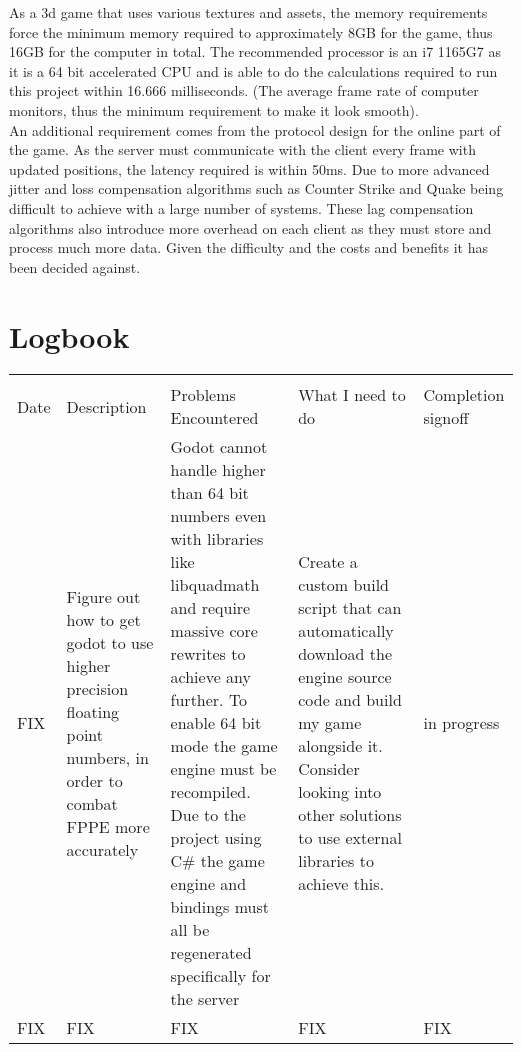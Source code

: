 \documentclass[12pt, DIV=calc]{scrartcl}
\begin{document}
\noindent As a 3d game that uses various textures and assets, the memory requirements force the minimum memory required to approximately 8GB for the game, thus 16GB for the computer in total. The recommended processor is an i7 1165G7 as it is a 64 bit accelerated CPU and is able to do the calculations required to run this project within 16.666 milliseconds. (The average frame rate of computer monitors, thus the minimum requirement to make it look smooth). \\

\noindent An additional requirement comes from the protocol design for the online part of the game. As the server must communicate with the client every frame with updated positions, the latency required is within 50ms. Due to more advanced jitter and loss compensation algorithms such as Counter Strike and Quake being difficult to achieve with a large number of systems. These lag compensation algorithms also introduce more overhead on each client as they must store and process much more data. Given the difficulty and the costs and benefits it has been decided against.

\section{Logbook}
\begin{xltabular}[c]{\textwidth}{| X | X | X | X | X |}
    \hline \\
Date & Description & Problems Encountered & What I need to do & Completion signoff \\ \hline

FIX & Figure out how to get godot to use higher precision floating point numbers, in order to combat FPPE more accurately & Godot cannot handle higher than 64 bit numbers even with libraries like libquadmath and require massive core rewrites to achieve any further. To enable 64 bit mode the game engine must be recompiled. Due to the project using C\# the game engine and bindings must all be regenerated specifically for the server & Create a custom build script that can automatically download the engine source code and build my game alongside it. Consider looking into other solutions to use external libraries to achieve this. & in progress \\ \hline
FIX & FIX & FIX & FIX & FIX \\
    \hline
\end{xltabular}
\end{document}
